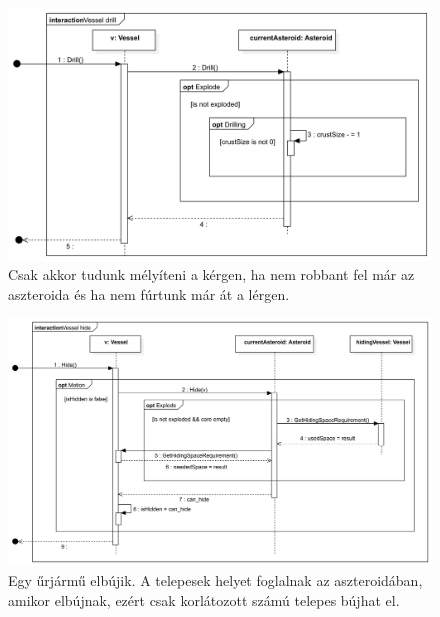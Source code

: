 \begin{figure}[H] 
\centering 
\includegraphics[width=1\textwidth]{docs/3_Project/svg/Design Model!Vessel Actions!Vessel drill!Vessel drill_12.png} 
\caption{Csak akkor tudunk mélyíteni a kérgen, ha nem robbant fel már az aszteroida és ha nem fúrtunk már át a lérgen.} 
\end{figure} 

\begin{figure}[H] 
\centering 
\includegraphics[width=1\textwidth]{docs/3_Project/svg/Design Model!Vessel Actions!Vessel hide!Vessel hide_13.png} 
\caption{Egy űrjármű elbújik. A telepesek helyet foglalnak az aszteroidában, amikor elbújnak, ezért csak korlátozott számú telepes bújhat el.} 
\end{figure} 

